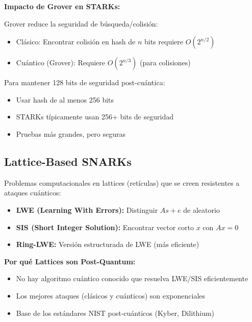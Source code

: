 \documentclass[11pt,a4paper,twoside]{book}
\begin{document}
\begin{mathnote}
\textbf{Impacto de Grover en STARKs:}

Grover reduce la seguridad de b\'usqueda/colisi\'on:
\begin{itemize}
    \item Cl\'asico: Encontrar colisi\'on en hash de $n$ bits requiere $O(2^{n/2})$
    \item Cu\'antico (Grover): Requiere $O(2^{n/3})$ (para colisiones)
\end{itemize}

Para mantener 128 bits de seguridad post-cu\'antica:
\begin{itemize}
    \item Usar hash de al menos 256 bits
    \item STARKs t\'ipicamente usan 256+ bits de seguridad
    \item Pruebas m\'as grandes, pero seguras
\end{itemize}
\end{mathnote}

\subsection{Lattice-Based SNARKs}

\begin{definition}
Problemas computacionales en lattices (ret\'iculas) que se creen resistentes a ataques cu\'anticos:
\begin{itemize}
    \item \textbf{LWE (Learning With Errors):} Distinguir $As + e$ de aleatorio
    \item \textbf{SIS (Short Integer Solution):} Encontrar vector corto $x$ con $Ax = 0$
    \item \textbf{Ring-LWE:} Versi\'on estructurada de LWE (m\'as eficiente)
\end{itemize}
\end{definition}

\begin{mathnote}
\textbf{Por qu\'e Lattices son Post-Quantum:}
\begin{itemize}
    \item No hay algoritmo cu\'antico conocido que resuelva LWE/SIS eficientemente
    \item Los mejores ataques (cl\'asicos y cu\'anticos) son exponenciales
    \item Base de los est\'andares NIST post-cu\'anticos (Kyber, Dilithium)
\end{itemize}
\end{mathnote}
\end{document}
